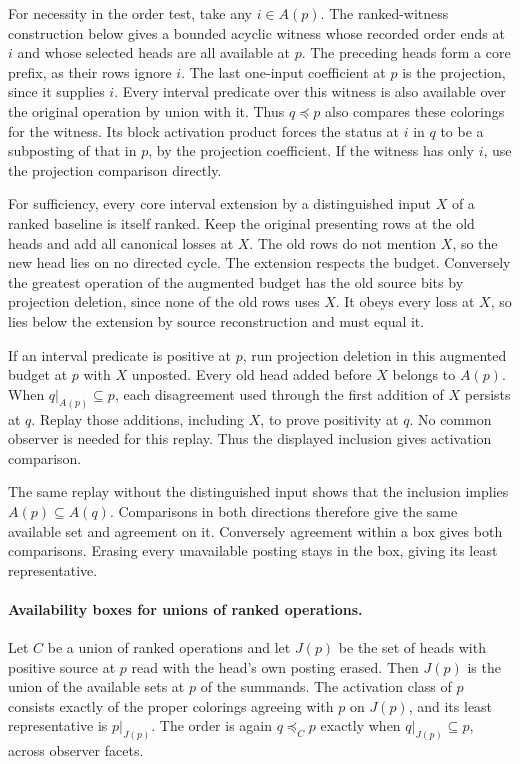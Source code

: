 For necessity in the order test, take any $i\in A(p)$.
The ranked-witness construction below gives a bounded
acyclic witness whose recorded order ends at $i$ and
whose selected heads are all available at $p$.
The preceding heads form a core prefix, as their rows
ignore $i$. The last one-input coefficient at $p$ is
the projection, since it supplies $i$. Every interval
predicate over this witness is also available over the
original operation by union with it. Thus $q\preceq p$
also compares these colorings for the witness. Its block
activation product forces the status at $i$ in $q$ to
be a subposting of that in $p$, by the projection
coefficient. If the witness has only $i$, use the
projection comparison directly.

For sufficiency, every core interval extension by a
distinguished input $X$ of a ranked baseline is itself
ranked. Keep the original presenting rows at the old heads
and add all canonical losses at $X$. The old rows do not
mention $X$, so the new head lies on no directed cycle.
The extension respects the budget. Conversely the greatest
operation of the augmented budget has the old source bits
by projection deletion, since none of the old rows uses
$X$. It obeys every loss at $X$, so lies below the extension
by source reconstruction and must equal it.

If an interval predicate is positive at $p$, run projection
deletion in this augmented budget at $p$ with $X$ unposted.
Every old head added before $X$ belongs to $A(p)$.
When $q|_{A(p)}\subseteq p$, each disagreement used through
the first addition of $X$ persists at $q$. Replay those
additions, including $X$, to prove positivity at $q$.
No common observer is needed for this replay. Thus the
displayed inclusion gives activation comparison.

The same replay without the distinguished input shows that
the inclusion implies $A(p)\subseteq A(q)$. Comparisons
in both directions therefore give the same available set
and agreement on it. Conversely agreement within a box gives
both comparisons. Erasing every unavailable posting stays
in the box, giving its least representative.

\paragraph{Availability boxes for unions of ranked operations.}
Let $C$ be a union of ranked operations and let $J(p)$ be
the set of heads with positive source at $p$ read with the
head's own posting erased. Then $J(p)$ is the union of the
available sets at $p$ of the summands. The activation class
of $p$ consists exactly of the proper colorings agreeing
with $p$ on $J(p)$, and its least representative is
$p|_{J(p)}$. The order is again $q\preceq_C p$ exactly
when $q|_{J(p)}\subseteq p$, across observer facets.

